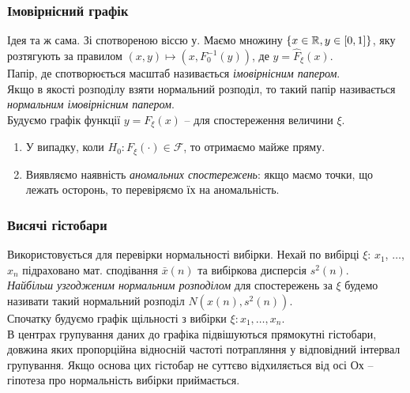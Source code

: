 
\subsubsection{Імовірнісний графік}

Ідея та ж сама. Зі спотвореною віссю $у$. Маємо множину $\{x \in \mathbb{R}, y \in [0,1]\}$, яку розтягують за правилом $(x, y) \mapsto \left(x, F_0^{-1}(y)\right)$, де $y = \widehat{F}_\xi (x)$. \\

Папір, де спотворюється масштаб називається \textit{імовірнісним папером}. \\

Якщо в якості розподілу взяти нормальний розподіл, то такий папір називається \textit{нормальним імовірнісним папером}. \\

Будуємо графік функції $y = F_\xi(x)$ -- для спостереження величини $\xi$.
\begin{enumerate}
	\item У випадку, коли $H_0: F_\xi(\cdot)\in \mathcal{F}$, то отримаємо майже пряму.

	\item Виявляємо наявність \textit{аномальних спостережень}: якщо маємо точки, що лежать осторонь, то перевіряємо їх на аномальність.
\end{enumerate}

 
\subsubsection{Висячі гістобари}

Використовується для перевірки нормальності вибірки. Нехай по вибірці $\xi$: $x_1$, $\ldots$, $x_n$ підраховано мат. сподівання $\bar x(n)$ та вибіркова дисперсія $s^2(n)$. \\

\textit{Найбільш узгодженим нормальним розподілом} для спостережень за $\xi$ будемо називати такий нормальний розподіл $N\left(x(n), s^2(n)\right)$. \\

Спочатку будуємо графік щільності з вибірки $\xi: x_1, \ldots, x_n$. \\

В центрах групування даних до графіка підвішуються прямокутні гістобари, довжина яких пропорційна відносній частоті потрапляння у відповідний інтервал групування. Якщо основа
цих гістобар не суттєво відхиляється від осі $Ох$ -- гіпотеза про нормальність вибірки приймається.

